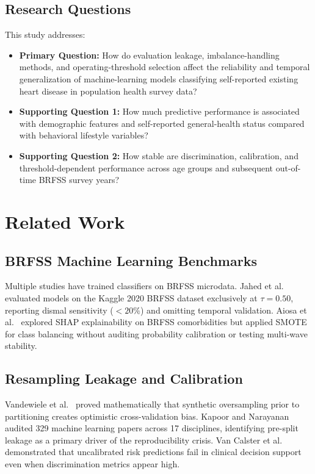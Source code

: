 \documentclass[11pt,a4paper]{article}
\begin{document}
\subsection{Research Questions}
This study addresses:
\begin{itemize}
    \item \textbf{Primary Question:} How do evaluation leakage, imbalance-handling methods, and operating-threshold selection affect the reliability and temporal generalization of machine-learning models classifying self-reported existing heart disease in population health survey data?
    \item \textbf{Supporting Question 1:} How much predictive performance is associated with demographic features and self-reported general-health status compared with behavioral lifestyle variables?
    \item \textbf{Supporting Question 2:} How stable are discrimination, calibration, and threshold-dependent performance across age groups and subsequent out-of-time BRFSS survey years?
\end{itemize}

\section{Related Work}

\subsection{BRFSS Machine Learning Benchmarks}
Multiple studies have trained classifiers on BRFSS microdata. Jahed et al.~\cite{Jahed2023_ICSCA} evaluated models on the Kaggle 2020 BRFSS dataset exclusively at $\tau = 0.50$, reporting dismal sensitivity ($<20\%$) and omitting temporal validation. Aiosa et al.~\cite{Aiosa2023_IEEEAccess} explored SHAP explainability on BRFSS comorbidities but applied SMOTE for class balancing without auditing probability calibration or testing multi-wave stability.

\subsection{Resampling Leakage and Calibration}
Vandewiele et al.~\cite{Vandewiele2021_ML} proved mathematically that synthetic oversampling prior to partitioning creates optimistic cross-validation bias. Kapoor and Narayanan~\cite{Kapoor2023_Patterns} audited 329 machine learning papers across 17 disciplines, identifying pre-split leakage as a primary driver of the reproducibility crisis. Van Calster et al.~\cite{VanCalster2019_BMCMed} demonstrated that uncalibrated risk predictions fail in clinical decision support even when discrimination metrics appear high.
\end{document}
